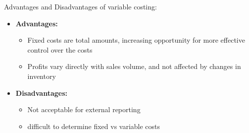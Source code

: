 \documentclass[english, 12pt]{article}
\begin{document}

\begin{note}
Advantages and Disadvantages of variable costing:
\begin{itemize}
\item \textbf{Advantages:}
\begin{itemize}
\item Fixed costs are total amounts, increasing opportunity for more effective control over the costs
\item Profits vary directly with sales volume, and not affected by changes in inventory
\end{itemize}
\item \textbf{Disadvantages:}
\begin{itemize}
\item Not acceptable for external reporting
\item difficult to determine fixed vs variable costs
\end{itemize}
\end{itemize}
\end{note}
\end{document}

